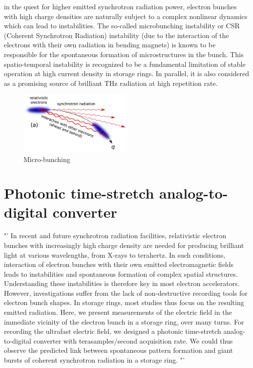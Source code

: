 in the quest for higher emitted synchrotron radiation
power, electron bunches with high charge densities are naturally subject to
a complex nonlinear dynamics which can lead to instabilities. The so-called microbunching
instability or CSR (Coherent Synchrotron Radiation) instability (due
to the interaction of the electrons with their own radiation in bending magnets) is
known to be responsible for the spontaneous formation of microstructures in the
bunch. This spatio-temporal instability is recognized to be a fundamental limitation
of stable operation at high current density in storage rings. In parallel, it
is also considered as a promising source of brilliant THz radiation at high repetition
rate.
\begin{figure}[H]
	\centering
	\includegraphics[width = 0.5\textwidth]{chap/02-theory/img/csr.png}
	\caption{Micro-bunching \cite{Bielawski2019}}
	\label{fig:microBunch}
\end{figure}

\newpage 
\section{Photonic time-stretch analog-to-digital converter}










"' In recent and future synchrotron radiation facilities, relativistic electron bunches with increasingly high charge density are needed for producing brilliant light at various wavelengths, from X-rays to terahertz. In such conditions, interaction of electron bunches with their own emitted electromagnetic fields leads to instabilities and spontaneous formation of complex spatial structures. Understanding these instabilities is therefore key in most electron accelerators. However, investigations suffer from the lack of non-destructive recording tools for electron bunch shapes. In storage rings, most studies thus focus on the resulting emitted radiation. Here, we present measurements of the electric field in the immediate vicinity of the electron bunch in a storage ring, over many turns. For recording the ultrafast electric field, we designed a photonic time-stretch analog-to-digital converter with terasamples/second acquisition rate. We could thus observe the predicted link between spontaneous pattern formation and giant bursts of coherent synchrotron radiation in a storage ring. "'  \cite{Bielawski2019}

